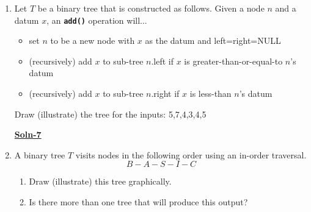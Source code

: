 \documentclass{article}
\begin{document}
\begin{enumerate}
\item   Let $T$ be a binary tree that is constructed as follows.
        Given a node $n$ and a datum $x$, an \texttt{\textbf{add()}}
        operation will...
        \begin{itemize}
        \item   set $n$ to be a new node with $x$ as the datum
                and left=right=NULL
        \item   (recursively) add $x$ to sub-tree $n$.left
                if $x$ is greater-than-or-equal-to $n$'s datum
        \item   (recursively) add $x$ to sub-tree $n$.right
                if $x$ is less-than $n$'s datum
        \end{itemize}
        Draw (illustrate) the tree for the inputs:  5,7,4,3,4,5

        \textbf{\underline{Soln-7}}

        \begin{center}\end{center}

\item   A binary tree $T$ visits nodes in the following order
        using an in-order traversal.
                \[ B-A-S-I-C \]
        \begin{enumerate}
        \item   Draw (illustrate) this tree graphically.
        \item   Is there more than one tree that will produce this
                output?
        \end{enumerate}


\end{enumerate}
\end{document}
